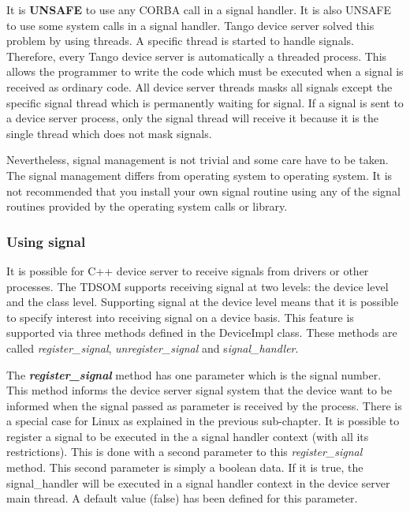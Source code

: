 It is \textbf{UNSAFE} to use any CORBA call in a signal handler. It
is also UNSAFE to use some system calls in a signal handler. Tango
device server solved this problem by using threads.
A specific thread is started to handle signals. Therefore,
every Tango device server is automatically a threaded process. This
allows the programmer to write the code which must be executed when
a signal is received as ordinary code. All device server threads masks
all signals except the specific signal thread which is permanently
waiting for signal. If a signal is sent to a device server process,
only the signal thread will receive it because it is the single thread
which does not mask signals.

Nevertheless, signal management is not trivial and some care have
to be taken. The signal management differs from operating system to
operating system. It is not recommended that you install your own
signal routine using any of the signal routines provided by the operating
system calls or library. 


\subsubsection{Using signal}

It is possible for C++ device server to receive signals from drivers
or other processes. The TDSOM supports receiving signal at two levels:
the device level and the class level. Supporting signal at the device
level means that it is possible to specify interest into receiving
signal on a device basis. This feature is supported via three methods
defined in the DeviceImpl class. These methods
are called \emph{register\_signal}, \emph{unregister\_signal} and
s\emph{ignal\_handler}.

The \textbf{\emph{register\_signal}} method
has one parameter which is the signal number. This method informs
the device server signal system that the device want to be informed
when the signal passed as parameter is received by the process. There
is a special case for Linux as explained in the previous sub-chapter.
It is possible to register a signal to be executed in the a signal
handler context (with all its restrictions). This is done with a second
parameter to this \emph{register\_signal} method. This second parameter
is simply a boolean data. If it is true, the signal\_handler will
be executed in a signal handler context in the device server main
thread. A default value (false) has been defined for this parameter.

